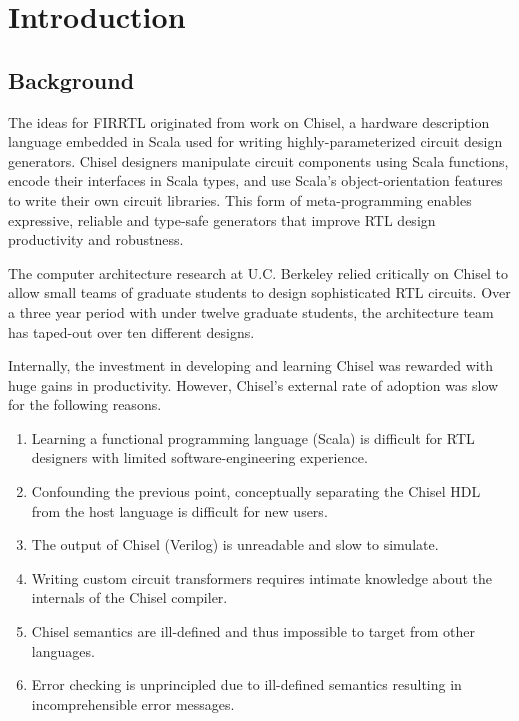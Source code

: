 \documentclass[12pt]{article}
\begin{document}
\maketitle
\tableofcontents
\newpage


\section{Introduction}

\subsection{Background}
The ideas for FIRRTL originated from work on Chisel, a hardware description language embedded in Scala used for writing highly-parameterized circuit design generators. Chisel designers manipulate circuit components using Scala functions, encode their interfaces in Scala types, and use Scala's object-orientation features to write their own circuit libraries. This form of meta-programming enables expressive, reliable and type-safe generators that improve RTL design productivity and robustness.

The computer architecture research at U.C. Berkeley relied critically on Chisel to allow small teams of graduate students to design sophisticated RTL circuits. Over a three year period with under twelve graduate students, the architecture team has taped-out over ten different designs. 

Internally, the investment in developing and learning Chisel was rewarded with huge gains in productivity. However, Chisel's external rate of adoption was slow for the following reasons.
\begin{enumerate}[topsep=3pt,itemsep=-0.5ex,partopsep=1ex,parsep=1ex]
\item Learning a functional programming language (Scala) is difficult for RTL designers with limited software-engineering experience.
\item Confounding the previous point, conceptually separating the Chisel HDL from the host language is difficult for new users.
\item The output of Chisel (Verilog) is unreadable and slow to simulate.
\item Writing custom circuit transformers requires intimate knowledge about the internals of the Chisel compiler.
\item Chisel semantics are ill-defined and thus impossible to target from other languages.
\item Error checking is unprincipled due to ill-defined semantics resulting in incomprehensible error messages.
\end{enumerate}
\end{document}
